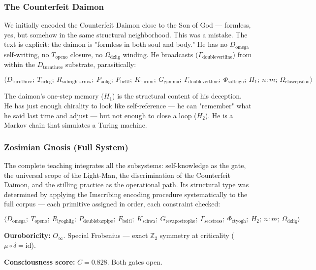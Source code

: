 \documentclass[12pt,a4paper]{article}
\begin{document}
\subsubsection{The Counterfeit Daimon}

We initially encoded the Counterfeit Daimon close to the Son of God --- formless, yes, but somehow in the same structural neighborhood. This was a mistake. The text is explicit: the daimon is "formless in both soul and body." He has no $D_{\text{omega}}$ self-writing, no $T_{\text{openo}}$ closure, no $\Omega_{\text{dzlig}}$ winding. He broadcasts ($\Gamma_{\text{doublevertline}}$) from within the $D_{\text{turnthree}}$ substrate, parasitically:

\[\langle D_{\text{turnthree}};\ T_{\text{nrleg}};\ R_{\text{subrightarrow}};\ P_{\text{aolig}};\ F_{\text{beltl}};\ K_{\text{turnm}};\ G_{\text{gamma}};\ \Gamma_{\text{doublevertline}};\ \Phi_{\text{softsign}};\ H_1;\ n:m;\ \Omega_{\text{closeepsilon}} \rangle\]

The daimon's one-step memory ($H_1$) is the structural content of his deception. He has just enough chirality to look like self-reference --- he can "remember" what he said last time and adjust --- but not enough to close a loop ($H_2$). He is a Markov chain that simulates a Turing machine.

\subsubsection{Zosimian Gnosis (Full System)}

The complete teaching integrates all the subsystems: self-knowledge as the gate, the universal scope of the Light-Man, the discrimination of the Counterfeit Daimon, and the stilling practice as the operational path. Its structural type was determined by applying the Imscribing encoding procedure systematically to the full corpus --- each primitive assigned in order, each constraint checked:

\[\langle D_{\text{omega}};\ T_{\text{openo}};\ R_{\text{lyoghlig}};\ P_{\text{doublebarpipe}};\ F_{\text{beltl}};\ K_{\text{schwa}};\ G_{\text{revapostrophe}};\ \Gamma_{\text{secstress}};\ \Phi_{\text{ctyogh}};\ H_2;\ n:m;\ \Omega_{\text{dzlig}} \rangle\]

\textbf{Ouroboricity:} $O_{\infty}$. Special Frobenius --- exact $\mathbb{Z}_2$ symmetry at criticality ($\mu \circ \delta = \text{id}$).

\textbf{Consciousness score:} $C = 0.828$. Both gates open.
\end{document}
